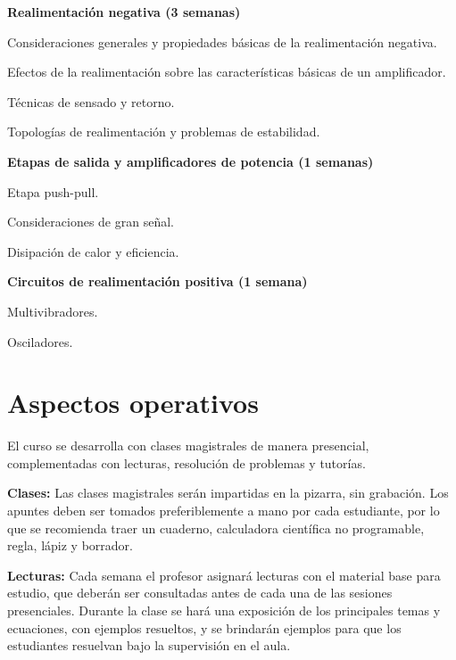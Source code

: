 \documentclass[11pt,oneside,letterpaper]{article}
\begin{document}
\begin{compactenum}[nolistsep]
\item \textbf{Realimentación negativa (3 semanas)}
    \begin{compactenum}[nolistsep]
    \item Consideraciones generales y propiedades básicas de la realimentación negativa.
    \item Efectos de la realimentación sobre las características básicas de un amplificador.
    \item Técnicas de sensado y retorno.
    \item Topologías de realimentación y problemas de estabilidad.
    \end{compactenum}

\item \textbf{Etapas de salida y amplificadores de potencia (1 semanas)}
    \begin{compactenum}[nolistsep]
    \item Etapa push-pull.
    \item Consideraciones de gran señal.
    \item Disipación de calor y eficiencia.
    \end{compactenum}

\item \textbf{Circuitos de realimentación positiva (1 semana)}
    \begin{compactenum}[nolistsep]
    \item Multivibradores.
    \item Osciladores.
    \end{compactenum}

\end{compactenum}

\newpage
\section{Aspectos operativos}

%
El curso se desarrolla con clases magistrales de manera presencial, complementadas con lecturas, resolución de problemas y tutorías.

\textbf{Clases:} Las clases magistrales serán impartidas en la pizarra, sin grabación. Los apuntes deben ser tomados preferiblemente a mano por cada estudiante, por lo que se recomienda traer un cuaderno, calculadora científica no programable, regla, lápiz y borrador.

\textbf{Lecturas:} Cada semana el profesor asignará lecturas con el material base para estudio, que deberán ser consultadas antes de cada una de las sesiones presenciales. Durante la clase se hará una exposición de los principales temas y ecuaciones, con ejemplos resueltos, y se brindarán ejemplos para que los estudiantes resuelvan bajo la supervisión en el aula.
\end{document}
